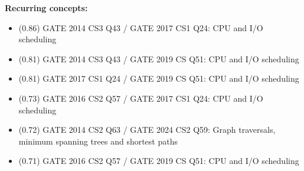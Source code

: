 \smallskip\noindent\textbf{Recurring concepts:}\begin{itemize}[leftmargin=1.4em,itemsep=1pt]
\item (0.86) GATE 2014 CS3 Q43 / GATE 2017 CS1 Q24: CPU and I/O scheduling
\item (0.81) GATE 2014 CS3 Q43 / GATE 2019 CS Q51: CPU and I/O scheduling
\item (0.81) GATE 2017 CS1 Q24 / GATE 2019 CS Q51: CPU and I/O scheduling
\item (0.73) GATE 2016 CS2 Q57 / GATE 2017 CS1 Q24: CPU and I/O scheduling
\item (0.72) GATE 2014 CS2 Q63 / GATE 2024 CS2 Q59: Graph traversals, minimum spanning trees and shortest paths
\item (0.71) GATE 2016 CS2 Q57 / GATE 2019 CS Q51: CPU and I/O scheduling
\end{itemize}

